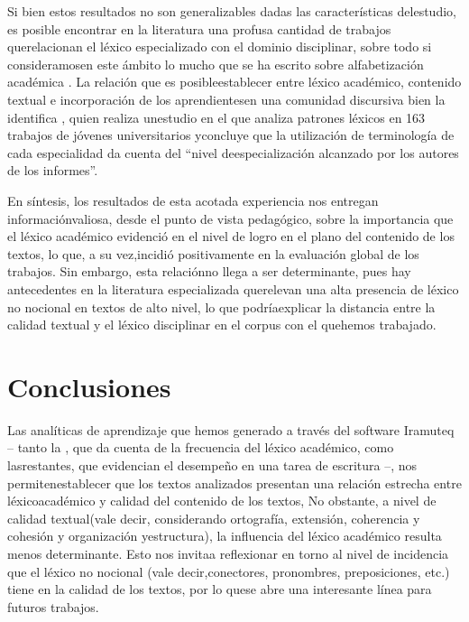 \documentclass{textolivre}
\begin{document}
Si bien estos resultados no son generalizables dadas las características
delestudio, es posible encontrar en la literatura una profusa cantidad de
trabajos querelacionan el léxico especializado con el dominio disciplinar,
sobre todo si consideramosen este ámbito lo mucho que se ha escrito sobre
alfabetización académica \cite{cantis2013,Baker2019,Kse2019}.
La relación que es posibleestablecer entre léxico académico, contenido
textual e incorporación de los aprendientesen una comunidad discursiva bien la
identifica \textcite[p. 55]{acevedo2006}, quien realiza unestudio en el que analiza
patrones léxicos en 163 trabajos de jóvenes universitarios yconcluye que la
utilización de terminología de cada especialidad da cuenta del “nivel
deespecialización alcanzado por los autores de los informes”.

En síntesis, los resultados de esta acotada experiencia nos entregan
informaciónvaliosa, desde el punto de vista pedagógico, sobre la importancia
que el léxico académico evidenció en el nivel de logro en el plano del
contenido de los textos, lo que, a su vez,incidió positivamente en la
evaluación global de los trabajos. Sin embargo, esta relaciónno llega a ser
determinante, pues hay antecedentes en la literatura especializada querelevan
una alta presencia de léxico no nocional en textos de alto nivel, lo que
podríaexplicar la distancia entre la calidad textual y el léxico disciplinar en
el corpus con el quehemos trabajado.



\section{Conclusiones}\label{sec-conclusiones}
Las analíticas de aprendizaje que hemos generado a través del software
Iramuteq – tanto la , que da cuenta de la frecuencia del léxico
académico, como lasrestantes, que evidencian el desempeño en una tarea de
escritura –, nos permitenestablecer que los textos analizados presentan una
relación estrecha entre léxicoacadémico y calidad del contenido de los textos,
No obstante, a nivel de calidad textual(vale decir, considerando ortografía,
extensión, coherencia y cohesión y organización yestructura), la influencia del
léxico académico resulta menos determinante. Esto nos invitaa reflexionar en
torno al nivel de incidencia que el léxico no nocional (vale decir,conectores,
pronombres, preposiciones, etc.) tiene en la calidad de los textos, por lo
quese abre una interesante línea para futuros trabajos.
\end{document}
